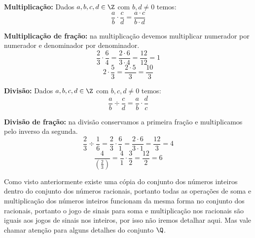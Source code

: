 \vskip0.5cm

 \colorbox{azul}{
 \begin{minipage}{0.9\linewidth}
 \begin{center}
  \textbf{Multiplicação:} Dados $a, b, c, d \in \Z$ com $b, d \neq 0$ temos:
\begin{equation}
\frac{a}{b} \cdot \frac{c}{d}= \frac{a \cdot c}{b \cdot d} 
\end{equation}
 \end{center}
 \end{minipage}}

 \vskip0.3cm
 \begin{exem}
  \textbf{Multiplicação de fração:} na multiplicação devemos multiplicar numerador por numerador e denominador por denominador.
\begin{equation}
\frac{2}{3} \cdot \frac{6}{4}= \frac{2 \cdot 6}{3 \cdot 4}= \frac{12}{12}= 1 
\end{equation}
\begin{equation}
2 \cdot \frac{5}{3}= \frac{2 \cdot 5}{3}= \frac{10}{3}
\end{equation}
 \end{exem}

 \vskip0.3cm

 \colorbox{azul}{
 \begin{minipage}{0.9\linewidth}
 \begin{center}
  \textbf{Divisão:} Dados $a, b, c, d \in \Z$ com $b, c, d \neq 0$ temos:
\begin{equation}
\frac{a}{b} \div \frac{c}{d}= \frac{a}{b} \cdot \frac{d}{c} 
\end{equation}
 \end{center}
 \end{minipage}}

 \vskip0.3cm
 \begin{exem}
  \textbf{Divisão de fração:} na divisão conservamos a primeira fração e multiplicamos pelo inverso da segunda.
\begin{equation}
\frac{2}{3} \div \frac{1}{6}= \frac{2}{3} \cdot \frac{6}{1}= \frac{2 \cdot 6}{3 \cdot 1}= \frac{12}{3}= 4 
\end{equation}
\begin{equation}
\frac{4}{\left(\frac{2}{3}\right)}= \frac{4}{1} \cdot \frac{3}{2}= \frac{12}{2}=6
\end{equation}
 \end{exem}

 Como visto anteriormente existe uma cópia do conjunto dos números inteiros dentro do conjunto dos números racionais, portanto todas as operações de soma e multiplicação dos números inteiros funcionam da mesma forma no conjunto dos racionais, portanto o jogo de sinais para soma e multiplicação nos racionais são iguais aos jogos de sinais nos inteiros, por isso não iremos detalhar aqui. Mas vale chamar atenção para alguns detalhes do conjunto $\Q$.

